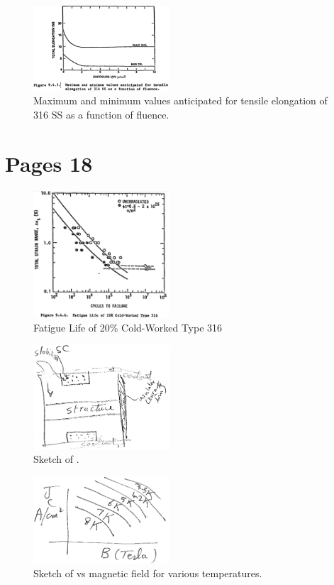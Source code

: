 \documentclass[11pt]{report} %
\begin{document}
\begin{figure}[H]
  \centering
  \includegraphics[width=0.45\textwidth]{figs/elongation.png}
  \caption{Maximum and minimum values anticipated for tensile elongation of 316 SS as a function of fluence.}
  \label{fig:elongation}
\end{figure}

\section{Pages 18}

\begin{figure}[H]
  \centering
  \includegraphics[width=0.45\textwidth]{figs/fatigueLife.png}
  \caption{Fatigue Life of 20\% Cold-Worked Type 316}
  \label{fig:fatigueLife}
\end{figure}

\begin{figure}[H]
  \centering
  \includegraphics[width=0.45\textwidth]{sketches/sketch4.png}
  \caption{Sketch of .}
\end{figure}

\begin{figure}[H]
  \centering
  \includegraphics[width=0.45\textwidth]{sketches/sketch5.png}
  \caption{Sketch of vs magnetic field for various temperatures.}
\end{figure}
\end{document}
